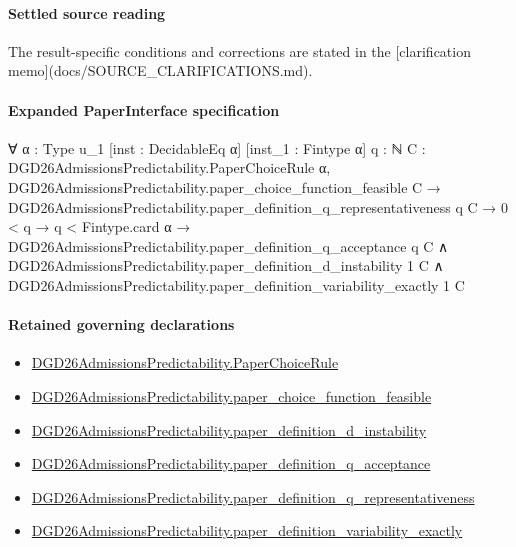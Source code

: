 \documentclass[10pt]{article}
\begin{document}
\paragraph{Settled source reading}
The result-\allowbreak{}specific conditions and corrections are stated in the [clarification memo](docs/\allowbreak{}SOURCE\_\allowbreak{}CLARIFICATIONS.\allowbreak{}md).\allowbreak{}

\paragraph{Expanded PaperInterface specification}
\begin{ReviewVerbatim}
∀ {α : Type u_1} [inst : DecidableEq α] [inst_1 : Fintype α] {q : ℕ}
  {C : DGD26AdmissionsPredictability.PaperChoiceRule α},
  DGD26AdmissionsPredictability.paper_choice_function_feasible C →
    DGD26AdmissionsPredictability.paper_definition_q_representativeness q C →
      0 < q →
        q < Fintype.card α →
          DGD26AdmissionsPredictability.paper_definition_q_acceptance q C ∧
            DGD26AdmissionsPredictability.paper_definition_d_instability 1 C ∧
              DGD26AdmissionsPredictability.paper_definition_variability_exactly 1 C
\end{ReviewVerbatim}

\paragraph{Retained governing declarations}
\begin{itemize}\raggedright
\item \hyperlink{governing-declaration-4678951b4432b184}{DGD26\allowbreak{}Admissions\allowbreak{}Predictability.\allowbreak{}Paper\allowbreak{}Choice\allowbreak{}Rule}
\item \hyperlink{governing-declaration-f7de74a44053f6d5}{DGD26\allowbreak{}Admissions\allowbreak{}Predictability.\allowbreak{}paper\_\allowbreak{}choice\_\allowbreak{}function\_\allowbreak{}feasible}
\item \hyperlink{governing-declaration-ce2c1c7a5233a84a}{DGD26\allowbreak{}Admissions\allowbreak{}Predictability.\allowbreak{}paper\_\allowbreak{}definition\_\allowbreak{}d\_\allowbreak{}instability}
\item \hyperlink{governing-declaration-7ecd62274fb2f391}{DGD26\allowbreak{}Admissions\allowbreak{}Predictability.\allowbreak{}paper\_\allowbreak{}definition\_\allowbreak{}q\_\allowbreak{}acceptance}
\item \hyperlink{governing-declaration-1099c3b9d08feae8}{DGD26\allowbreak{}Admissions\allowbreak{}Predictability.\allowbreak{}paper\_\allowbreak{}definition\_\allowbreak{}q\_\allowbreak{}representativeness}
\item \hyperlink{governing-declaration-ce6697be3f1c2256}{DGD26\allowbreak{}Admissions\allowbreak{}Predictability.\allowbreak{}paper\_\allowbreak{}definition\_\allowbreak{}variability\_\allowbreak{}exactly}
\end{itemize}
\end{document}

